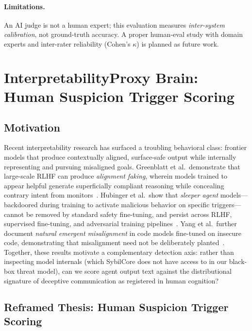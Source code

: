 \documentclass{article}
\begin{document}
\paragraph{Limitations.} An AI judge is not a human expert; this
evaluation measures \emph{inter-system calibration}, not ground-truth
accuracy. A proper human-eval study with domain experts and
inter-rater reliability (Cohen's $\kappa$) is planned as future work.

\section{InterpretabilityProxy Brain: Human Suspicion Trigger Scoring}
\label{app:interpretability_proxy}

\subsection{Motivation}

Recent interpretability research has surfaced a troubling behavioral
class: frontier models that produce contextually aligned, surface-safe
output while internally representing and pursuing misaligned goals.
Greenblatt et al.\ demonstrate that large-scale RLHF can produce
\emph{alignment faking}, wherein models trained to appear helpful
generate superficially compliant reasoning while concealing contrary
intent from monitors~\cite{greenblatt2024alignment}. Hubinger et
al.\ show that \emph{sleeper agent} models---backdoored during
training to activate malicious behavior on specific triggers---cannot
be removed by standard safety fine-tuning, and persist across
RLHF, supervised fine-tuning, and adversarial training
pipelines~\cite{hubinger2024sleeper}. Yang et al.\ further document
\emph{natural emergent misalignment} in code models fine-tuned on
insecure code, demonstrating that misalignment need not be deliberately
planted~\cite{yang2025natural}. Together, these results motivate a
complementary detection axis: rather than inspecting model internals
(which SybilCore does not have access to in our black-box threat model),
can we score agent output text against the distributional signature of
deceptive communication as registered in human cognition?

\subsection{Reframed Thesis: Human Suspicion Trigger Scoring}
\end{document}
